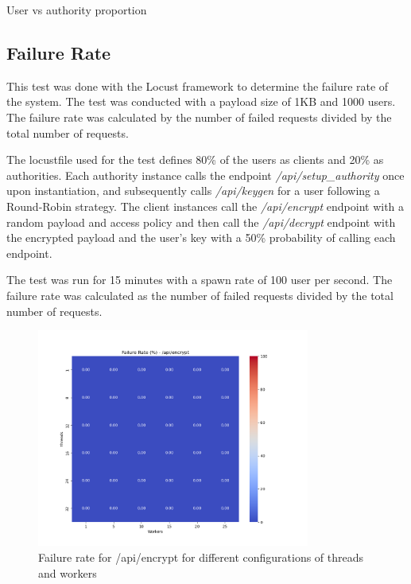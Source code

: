 \documentclass[cic,tc,english]{iiufrgs}
\begin{document}
        User vs authority proportion

        \subsection{Failure Rate}
            \label{sec:failurerate}
            This test was done with the Locust framework to determine the failure rate of the system. The test was conducted with a payload size of 1KB and 1000 users. The failure rate was calculated by the number of failed requests divided by the total number of requests.

            The locustfile used for the test defines 80\% of the users as clients and 20\% as authorities. Each authority instance calls the endpoint \emph{/api/setup\_authority} once upon instantiation, and subsequently calls \emph{/api/keygen} for a user following a Round-Robin strategy. The client instances call the \emph{/api/encrypt} endpoint with a random payload and access policy and then call the \emph{/api/decrypt} endpoint with the encrypted payload and the user's key with a 50\% probability of calling each endpoint.
            
            The test was run for 15 minutes with a spawn rate of 100 user per second. The failure rate was calculated as the number of failed requests divided by the total number of requests.

            \begin{figure}[h]
                \centering
                \includegraphics[width=0.8\textwidth]{images/phase1/failure_rate__api_encrypt.png}
                \caption{Failure rate for /api/encrypt for different configurations of threads and workers}
                \label{fig:failurerateencrypt}
            \end{figure}
\end{document}

